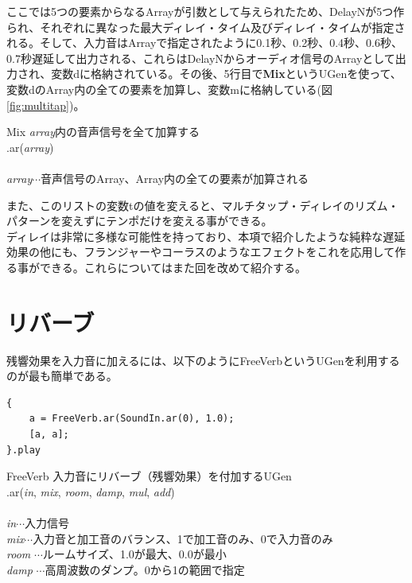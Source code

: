 \documentclass{jsarticle}
\begin{document}
ここでは5つの要素からなるArrayが引数として与えられたため、DelayNが5つ作られ、それぞれに異なった最大ディレイ・タイム及びディレイ・タイムが指定される。そして、入力音はArrayで指定されたように0.1秒、0.2秒、0.4秒、0.6秒、0.7秒遅延して出力される、これらはDelayNからオーディオ信号のArrayとして出力され、変数dに格納されている。その後、5行目で{\bf Mix}というUGenを使って、変数dのArray内の全ての要素を加算し、変数mに格納している(図\ref{fig:multitap})。

\begin{itembox}[l]{Mix}
{\footnotesize 
{\it array}内の音声信号を全て加算する\\
.ar({\it array})\\\\
{\it array}$\cdots$音声信号のArray、Array内の全ての要素が加算される\\
}
\end{itembox}
また、このリストの変数tの値を変えると、マルチタップ・ディレイのリズム・パターンを変えずにテンポだけを変える事ができる。\\

ディレイは非常に多様な可能性を持っており、本項で紹介したような純粋な遅延効果の他にも、フランジャーやコーラスのようなエフェクトをこれを応用して作る事ができる。これらについてはまた回を改めて紹介する。

\section{リバーブ}
残響効果を入力音に加えるには、以下のようにFreeVerbというUGenを利用するのが最も簡単である。

\begin{lstlisting}[caption=リバーブ, label=code:reverb]
{
	a = FreeVerb.ar(SoundIn.ar(0), 1.0);
	[a, a];
}.play
\end{lstlisting}

\begin{itembox}[l]{FreeVerb}
{\footnotesize 
入力音にリバーブ（残響効果）を付加するUGen\\
.ar({\it in}, {\it mix}, {\it room}, {\it damp}, {\it mul}, {\it add})\\\\
{\it in}$\cdots$入力信号\\
{\it mix}$\cdots$入力音と加工音のバランス、1で加工音のみ、0で入力音のみ\\
{\it room} $\cdots$ルームサイズ、1.0が最大、0.0が最小\\
{\it damp} $\cdots$高周波数のダンプ。0から1の範囲で指定\\
}
\end{itembox}
\end{document}

